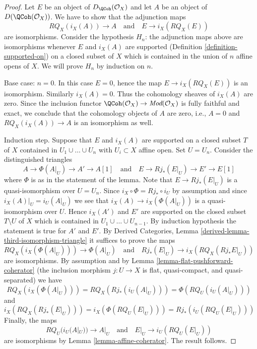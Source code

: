 \begin{proof}
Let $E$ be an object of $D_\QCoh(\mathcal{O}_X)$ and
let $A$ be an object of $D(\QCoh(\mathcal{O}_X))$.
We have to show that the adjunction maps
$$
RQ_X(i_X(A)) \to A
\quad\text{and}\quad
E \to i_X(RQ_X(E))
$$
are isomorphisms. Consider the hypothesis
$H_n$: the adjunction maps above are isomorphisms
whenever $E$ and $i_X(A)$ are supported
(Definition \ref{definition-supported-on})
on a closed subset of $X$ which
is contained in the union of $n$ affine opens of $X$.
We will prove $H_n$ by induction on $n$.

\medskip\noindent
Base case: $n = 0$. In this case $E = 0$, hence the map
$E \to i_X(RQ_X(E))$ is an isomorphism. Similarly $i_X(A) = 0$.
Thus the cohomology sheaves of $i_X(A)$ are zero. Since the inclusion
functor $\QCoh(\mathcal{O}_X) \to \textit{Mod}(\mathcal{O}_X)$
is fully faithful and exact, we conclude that the cohomology
objects of $A$ are zero, i.e., $A = 0$ and
$RQ_X(i_X(A)) \to A$ is an isomorphism as well.

\medskip\noindent
Induction step. Suppose that $E$ and $i_X(A)$ are supported on a
closed subset $T$ of $X$ contained in $U_1 \cup \ldots \cup U_n$
with $U_i \subset X$ affine open. Set $U = U_n$.
Consider the distinguished triangles
$$
A \to \Phi(A|_U) \to A' \to A[1]
\quad\text{and}\quad
E \to Rj_*(E|_U) \to E' \to E[1]
$$
where $\Phi$ is as in the statement of the lemma.
Note that $E \to Rj_*(E|_U)$ is a quasi-isomorphism over $U = U_n$.
Since $i_X \circ \Phi = Rj_* \circ i_U$ by assumption
and since $i_X(A)|_U = i_U(A|_U)$
we see that $i_X(A) \to i_X(\Phi(A|_U))$ is a quasi-isomorphism over $U$.
Hence $i_X(A')$ and $E'$ are supported on the closed
subset $T \setminus U$ of $X$ which is contained in
$U_1 \cup \ldots \cup U_{n - 1}$.
By induction hypothesis the statement is true for $A'$ and $E'$. By
Derived Categories, Lemma \ref{derived-lemma-third-isomorphism-triangle}
it suffices to prove the maps
$$
RQ_X(i_X(\Phi(A|_U))) \to \Phi(A|_U)
\quad\text{and}\quad
Rj_*(E|_U) \to i_X(RQ_X(Rj_*E|_U))
$$
are isomorphisms. By assumption and by
Lemma \ref{lemma-flat-pushforward-coherator}
(the inclusion morphism $j : U \to X$ is flat, quasi-compact, and
quasi-separated) we have
$$
RQ_X(i_X(\Phi(A|_U))) = RQ_X(Rj_*(i_U(A|_U))) = \Phi(RQ_U(i_U(A|_U)))
$$
and
$$
i_X(RQ_X(Rj_*(E|_U))) = i_X(\Phi(RQ_U(E|_U))) = Rj_*(i_U(RQ_U(E|_U)))
$$
Finally, the maps
$$
RQ_U(i_U(A|_U)) \to A|_U
\quad\text{and}\quad
E|_U \to i_U(RQ_U(E|_U))
$$
are isomorphisms by Lemma \ref{lemma-affine-coherator}. The result follows.
\end{proof}

